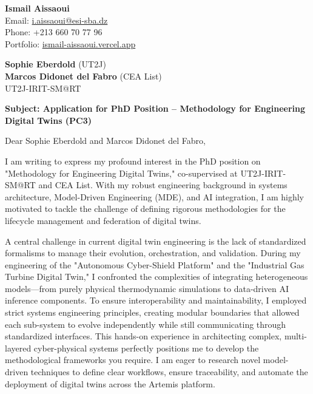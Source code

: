 \documentclass[11pt,a4paper]{article}
\begin{document}
\thispagestyle{empty}

\begin{flushright}
\textbf{Ismail Aissaoui} \\
Email: \href{mailto:i.aissaoui@esi-sba.dz}{i.aissaoui@esi-sba.dz} \\
Phone: +213 660 70 77 96 \\
Portfolio: \href{https://ismail-aissaoui.vercel.app}{ismail-aissaoui.vercel.app}
\end{flushright}

\vspace{1em}

\begin{flushleft}
\textbf{Sophie Eberdold} (UT2J) \\
\textbf{Marcos Didonet del Fabro} (CEA List) \\
UT2J-IRIT-SM@RT
\end{flushleft}

\vspace{1em}
\noindent\textbf{Subject: Application for PhD Position -- Methodology for Engineering Digital Twins (PC3)}
\vspace{1em}

\noindent Dear Sophie Eberdold and Marcos Didonet del Fabro,

\vspace{1em}
\noindent
I am writing to express my profound interest in the PhD position on "Methodology for Engineering Digital Twins," co-supervised at UT2J-IRIT-SM@RT and CEA List. With my robust engineering background in systems architecture, Model-Driven Engineering (MDE), and AI integration, I am highly motivated to tackle the challenge of defining rigorous methodologies for the lifecycle management and federation of digital twins.

\vspace{0.5em}
\noindent
A central challenge in current digital twin engineering is the lack of standardized formalisms to manage their evolution, orchestration, and validation. During my engineering of the "Autonomous Cyber-Shield Platform" and the "Industrial Gas Turbine Digital Twin," I confronted the complexities of integrating heterogeneous models—from purely physical thermodynamic simulations to data-driven AI inference components. To ensure interoperability and maintainability, I employed strict systems engineering principles, creating modular boundaries that allowed each sub-system to evolve independently while still communicating through standardized interfaces. This hands-on experience in architecting complex, multi-layered cyber-physical systems perfectly positions me to develop the methodological frameworks you require. I am eager to research novel model-driven techniques to define clear workflows, ensure traceability, and automate the deployment of digital twins across the Artemis platform.
\end{document}

